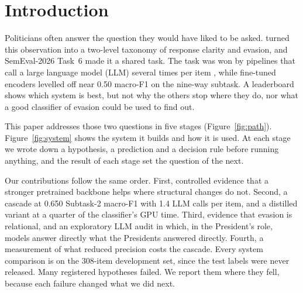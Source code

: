 \section{Introduction}
\label{sec:intro}
\FigurePath

Politicians often answer the question they would have liked to be asked.
\citet{thomas-etal-2024-never} turned this observation into a two-level taxonomy of response clarity and evasion, and SemEval-2026 Task~6 \citep{thomas-etal-2026-semeval} made it a shared task.
The task was won by pipelines that call a large language model (LLM) several times per item \citep{shi-etal-2026-teleai}, while fine-tuned encoders levelled off near 0.50 macro-F1 on the nine-way subtask.
A leaderboard shows which system is best, but not why the others stop where they do, nor what a good classifier of evasion could be used to find out.

This paper addresses those two questions in five stages (Figure~\ref{fig:path}). Figure~\ref{fig:system} shows the system it builds and how it is used.
At each stage we wrote down a hypothesis, a prediction and a decision rule before running anything, and the result of each stage set the question of the next.

\noindent Our contributions follow the same order. First, controlled evidence that a stronger pretrained backbone helps where structural changes do not. Second, a cascade at 0.650 Subtask-2 macro-F1 with 1.4 LLM calls per item, and a distilled variant at a quarter of the classifier's GPU time. Third, evidence that evasion is relational, and an exploratory LLM audit in which, in the President's role, models answer directly what the Presidents answered directly. Fourth, a measurement of what reduced precision costs the cascade.
Every system comparison is on the 308-item development set, since the test labels were never released.
Many registered hypotheses failed. We report them where they fell, because each failure changed what we did next.
